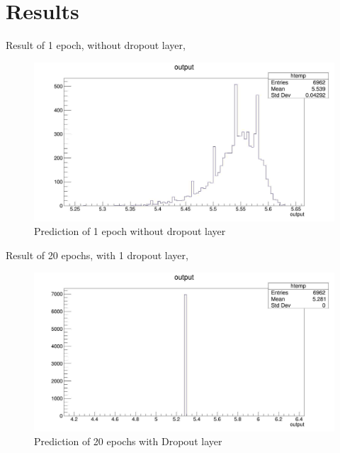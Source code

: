 \documentclass[12pt]{article}
\numberwithin{equation}{section}
\begin{document}
\section{Results}
Result of 1 epoch, without dropout layer,
\begin{figure}[H]
    \centering
    \includegraphics[width=0.75\linewidth]{figures/prediction.jpg}
    \caption{Prediction of 1 epoch without dropout layer}
    \label{}
\end{figure}
Result of 20 epochs, with 1 dropout layer,
\begin{figure}[H]
    \centering
    \includegraphics[width=0.75\linewidth]{figures/prediction20epochs.jpg}
    \caption{Prediction of 20 epochs with Dropout layer}
    \label{}
\end{figure}
\end{document}
